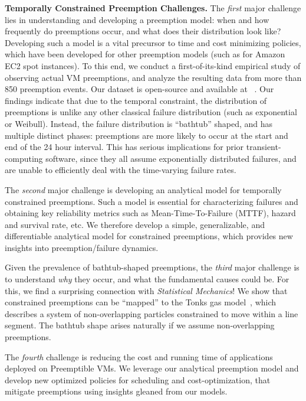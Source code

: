 \noindent \textbf{Temporally Constrained Preemption Challenges.}
The \emph{first} major challenge lies in understanding and developing a preemption model: when and how frequently do preemptions occur, and what does their distribution look like?
Developing such a model is a vital precursor to time and cost minimizing policies, which have been developed for other preemption models (such as for Amazon EC2 spot instances). 
To this end, we conduct a first-of-its-kind empirical study of observing actual VM preemptions, and analyze the resulting data from more than 850 preemption events.
Our dataset is open-source and available at ~\cite{scispot-dataset}. 
Our findings indicate that due to the temporal constraint, the distribution of preemptions is unlike any other classical failure distribution (such as exponential or Weibull).
Instead, the failure distribution is ``bathtub'' shaped, and has multiple distinct phases: preemptions are more likely to occur at the start and end of the 24 hour interval. 
This has serious implications for prior transient-computing software, since they all assume exponentially distributed failures, and are unable to efficiently deal with the time-varying failure rates.

The \emph{second} major challenge is developing an analytical model for temporally constrained preemptions.
Such a model is essential for characterizing failures and obtaining key reliability metrics such as Mean-Time-To-Failure (MTTF), hazard and survival rate, etc.
We therefore develop a simple, generalizable, and differentiable analytical model for constrained preemptions, which provides new insights into preemption/failure dynamics.

Given the prevalence of bathtub-shaped preemptions, the \emph{third} major challenge is to understand \emph{why} they occur, and what the fundamental causes could be. 
For this, we find a surprising connection with \emph{Statistical Mechanics}!
We show that constrained preemptions can be ``mapped'' to the Tonks gas model~\cite{tonks, krauth2006statistical}, which describes a system of non-overlapping particles constrained to move within a line segment. The bathtub shape arises naturally if we assume non-overlapping preemptions. 

The \emph{fourth} challenge is reducing the cost and running time of applications deployed on Preemptible VMs.
We leverage our analytical preemption model and develop new optimized policies for scheduling and cost-optimization, that mitigate preemptions using insights gleaned from our models.


